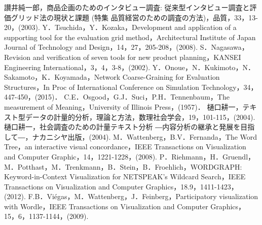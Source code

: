 \documentclass[syuuron]{kuee}
\begin{document}
\begin{thebibliography}{数字}
	 讃井純一郎，商品企画のためのインタビュー調査: 従来型インタビュー調査と評価グリッド法の現状と課題 (特集 品質経営のための調査の方法)，品質，33，13-20，(2003).
	 Y．Tsuchida，Y．Kozaka，Development and application of a supporting tool for the evaluation grid method，Architectural Institute of Japan Journal of Technology and Design，14，27，205-208，(2008).
	 S．Nagasawa，Revision and verification of seven tools for new product planning，KANSEI Engineering International，3，4，3-8，(2002).
	 Y．Onoue，N．Kukimoto，N．Sakamoto，K．Koyamada，Network Coarse-Graining for Evaluation Structures，In Proc of International Conference on Simulation Technology，34，447-450，(2015)．
	 C.E．Osgood，G.J．Suci，P.H．Tennenbaum，The measurement of Meaning，University of Illinois Press，(1957)．
	 樋口耕一，テキスト型データの計量的分析，理論と方法，数理社会学会，19，101-115，(2004).
	 樋口耕一，社会調査のための計量テキスト分析 ―内容分析の継承と発展を目指して―，ナカニシヤ出版，(2004).
	 M．Wattenberg，B.V．Fernanda，The Word Tree，an interactive visual concordance，IEEE Transactions on Visualization and Computer Graphic，14，1221-1228，(2008).
	 P．Riehmann，H．Gruendl，M．Potthast，M．Trenkmann，B．Stein，B．Froehlich，WORDGRAPH: Keyword-in-Context Visualization for NETSPEAK's Wildcard Search，IEEE Transactions on Visualization and Computer Graphics，18.9，1411-1423，(2012).
	 F.B．Viégas，M．Wattenberg，J．Feinberg，Participatory visualization with Wordle，IEEE Transactions on Visualization and Computer Graphics，15，6，1137-1144，(2009).


\end{thebibliography}
\end{document}
